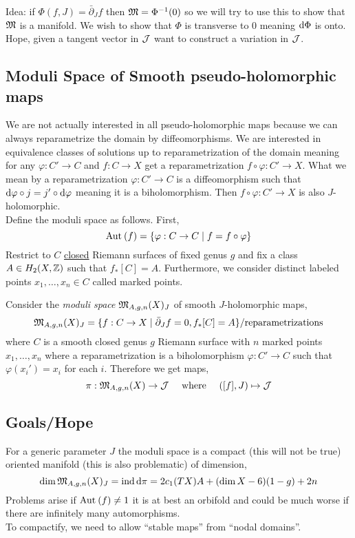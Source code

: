 \documentclass[12pt]{article}
\newcommand{\dbar}{\bar{\partial}}
\DeclareMathOperator{\ind}{\mathrm{ind}}
\begin{document}
Idea: if $\Phi(f, J) = \dbar_J f$ then $\mathfrak{M} = \Phi^{-1}(0)$ so we will try to use this to show that $\mathfrak{M}$ is a manifold. We wish to show that $\Phi$ is transverse to $0$ meaning $\mathrm{d}{\Phi}$ is onto. Hope, given a tangent vector in $\mathcal{J}$ want to construct a variation in $\mathcal{J}$. 

\subsection{Moduli Space of Smooth pseudo-holomorphic maps}

We are not actually interested in all pseudo-holomorphic maps because we can always reparametrize the domain by diffeomorphisms. We are interested in equivalence classes of solutions up to reparametrization of the domain meaning for any $\varphi : C' \to C$ and $f : C \to X$ get a reparametrization $f \circ \varphi : C' \to X$. What we mean by a reparametrization $\varphi : C' \to C$ is a diffeomorphism such that $\mathrm{d}{\varphi} \circ j = j' \circ \mathrm{d}{\varphi}$ meaning it is a biholomorphism. Then $f \circ \varphi : C' \to X$ is also $J$-holomorphic. 
\bigskip\\
Define the moduli space as follows. First, 
\[ \mathrm{Aut}_{} \left( f \right) = \{ \varphi : C \to C \mid f = f \circ \varphi \} \]
Restrict to $C$ \underline{closed} Riemann surfaces of fixed genus $g$ and fix a class $A \in H_2(X, \mathbb{Z})$ such that $f_* [C] = A$. Furthermore, we consider distinct labeled points $x_1, \dots, x_n \in C$ called marked points. 

\begin{defn}
Consider the \textit{moduli space} $\mathfrak{M}_{A, g, n}(X)_J$ of smooth $J$-holomorphic maps,
\[ \mf{M}_{A, g, n}(X)_J = \{ f : C \to X \mid \dbar_J f = 0, f_* [C] = A \} / \text{reparametrizations} \]
where $C$ is a smooth closed genus $g$ Riemann surface with $n$ marked points $x_1, \dots, x_n$ where a reparametrization is a biholomorphism $\varphi : C' \to C$ such that $\varphi(x_i') = x_i$ for each $i$. Therefore we get maps,
\[ \pi : \mathfrak{M}_{A, g, n}(X) \to \mathcal{J} \quad \text{ where } \quad ([f], J) \mapsto \mathcal{J} \]
\end{defn}

\subsection{Goals/Hope}

For a generic parameter $J$ the moduli space is a compact (this will not be true) oriented manifold (this is also problematic) of dimension,
\[ \dim{\mf{M}_{A,g,n}(X)_J} = \ind{\d{\pi}} = 2 c_1(TX) A + (\dim{X} - 6)(1-g) + 2n \]
Problems arise if $\mathrm{Aut}_{} \left( f \right) \neq 1$ it is at best an orbifold and could be much worse if there are infinitely many automorphisms. 
\bigskip\\
To compactify, we need to allow ``stable maps'' from ``nodal domains''.
\end{document}
